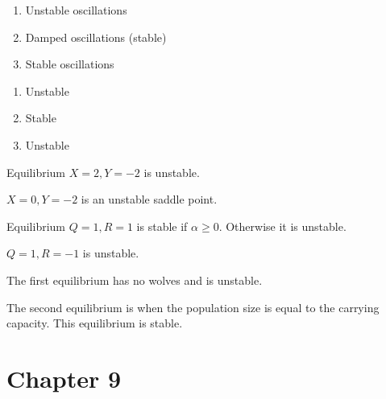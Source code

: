 \documentclass[]{memoir}
\begin{document}
\begin{enumerate}
\def\labelenumi{\arabic{enumi}.}
\itemsep1pt\parskip0pt
\item
  Unstable oscillations
\item
  Damped oscillations (stable)
\item
  Stable oscillations
\end{enumerate}


\begin{enumerate}
\def\labelenumi{\arabic{enumi}.}
\itemsep1pt\parskip0pt
\item
  Unstable
\item
  Stable
\item
  Unstable
\end{enumerate}


Equilibrium $X=2, Y=-2$ is unstable.

$X=0, Y=-2$ is an unstable saddle point.


Equilibrium $Q=1, R=1$ is stable if $\alpha \geq 0$. Otherwise it is
unstable.

$Q=1, R=-1$ is unstable.


The first equilibrium has no wolves and is unstable.

The second equilibrium is when the population size is equal to the
carrying capacity. This equilibrium is stable.

\section{Chapter 9}
\end{document}
